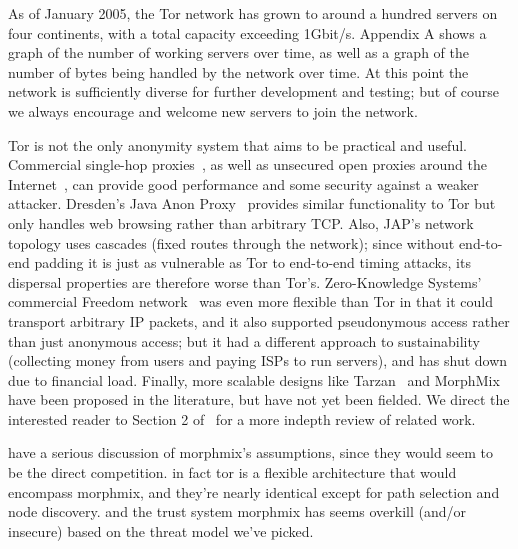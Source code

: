 \documentclass{llncs}
\begin{document}
As of January 2005, the Tor network has grown to around a hundred servers
on four continents, with a total capacity exceeding 1Gbit/s. Appendix A
shows a graph of the number of working servers over time, as well as a
graph of the number of bytes being handled by the network over time. At
this point the network is sufficiently diverse for further development
and testing; but of course we always encourage and welcome new servers
to join the network.


Tor is not the only anonymity system that aims to be practical and useful.
Commercial single-hop proxies~\cite{anonymizer}, as well as unsecured
open proxies around the Internet~\cite{open-proxies}, can provide good
performance and some security against a weaker attacker. Dresden's Java
Anon Proxy~\cite{web-mix} provides similar functionality to Tor but only
handles web browsing rather than arbitrary TCP\@. Also, JAP's network
topology uses cascades (fixed routes through the network); since without
end-to-end padding it is just as vulnerable as Tor to end-to-end timing
attacks, its dispersal properties are therefore worse than Tor's.
Zero-Knowledge Systems' commercial Freedom
network~\cite{freedom21-security} was even more flexible than Tor in
that it could transport arbitrary IP packets, and it also supported
pseudonymous access rather than just anonymous access; but it had
a different approach to sustainability (collecting money from users
and paying ISPs to run servers), and has shut down due to financial
load.  Finally, more scalable designs like Tarzan~\cite{tarzan:ccs02} and
MorphMix~\cite{morphmix:fc04} have been proposed in the literature, but
have not yet been fielded. We direct the interested reader to Section
2 of~\cite{tor-design} for a more indepth review of related work.



have a serious discussion of morphmix's assumptions, since they would
seem to be the direct competition. in fact tor is a flexible architecture
that would encompass morphmix, and they're nearly identical except for
path selection and node discovery. and the trust system morphmix has
seems overkill (and/or insecure) based on the threat model we've picked.
\end{document}
